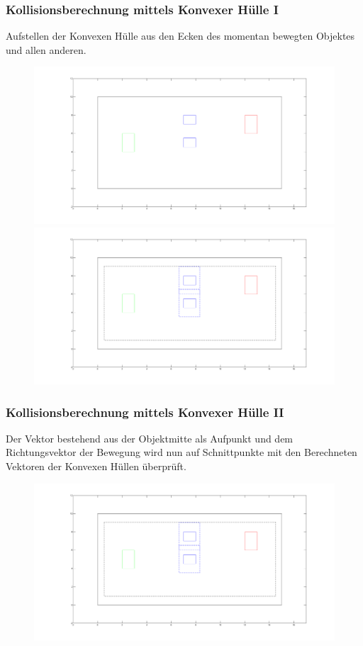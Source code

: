 \documentclass[final]{beamer}
\begin{document}
\begin{frame}
\frametitle{Kollisionsberechnung mittels Konvexer Hülle I }
Aufstellen der Konvexen Hülle aus den Ecken des momentan bewegten Objektes und allen anderen.
\begin{figure}
\centering
\includegraphics[scale=0.1]{../thesis/riddleWoHull}
\includegraphics[scale=0.1]{../thesis/riddleWHull}
\end{figure}
\end{frame}

\begin{frame}
\frametitle{Kollisionsberechnung mittels Konvexer Hülle II}
Der Vektor bestehend aus der Objektmitte als Aufpunkt und dem Richtungsvektor der Bewegung wird nun auf Schnittpunkte mit den Berechneten Vektoren der Konvexen Hüllen überprüft.
\begin{figure}
\centering
\includegraphics[scale=0.1]{../thesis/riddleWHull}
\end{figure}
\end{frame}
\end{document}

